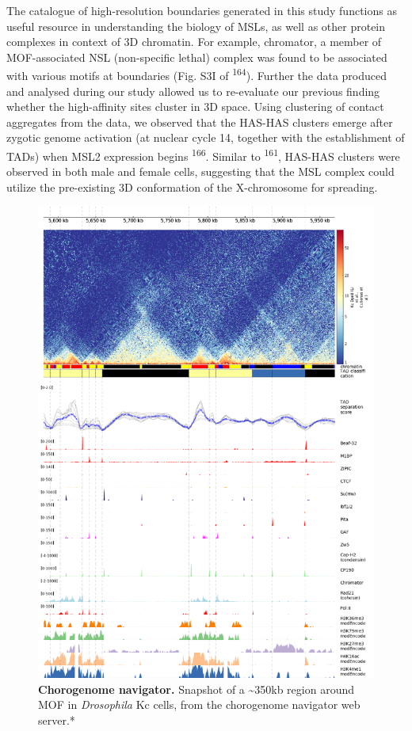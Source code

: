 \documentclass[11pt,twoside]{MPIthesis}
\theoremstyle{definition}
\theoremstyle{definition}
\theoremstyle{definition}
\theoremstyle{remark}
\begin{document}
The catalogue of high-resolution boundaries generated in this study
functions as useful resource in understanding the biology of MSLs, as
well as other protein complexes in context of 3D chromatin. For example,
chromator, a member of MOF-associated NSL (non-specific lethal) complex
was found to be associated with various motifs at boundaries (Fig. S3I
of \textsuperscript{164}). Further the data produced and analysed during
our study allowed us to re-evaluate our previous finding whether the
high-affinity sites cluster in 3D space. Using clustering of contact
aggregates from the data, we observed that the HAS-HAS clusters emerge
after zygotic genome activation (at nuclear cycle 14, together with the
establishment of TADs) when MSL2 expression begins
\textsuperscript{166}. Similar to \textsuperscript{161}, HAS-HAS
clusters were observed in both male and female cells, suggesting that
the MSL complex could utilize the pre-existing 3D conformation of the
X-chromosome for spreading.
\begin{figure}

{\centering \includegraphics[width=0.8\linewidth,height=0.6\textheight]{figures/results_fig3} 

}

\caption[Chorogenome navigator]{\textbf{Chorogenome navigator.} Snapshot of a
\textasciitilde{}350kb region around MOF in \emph{Drosophila} Kc cells,
from the chorogenome navigator web server.*}\label{fig:unnamed-chunk-8}
\end{figure}
\end{document}
